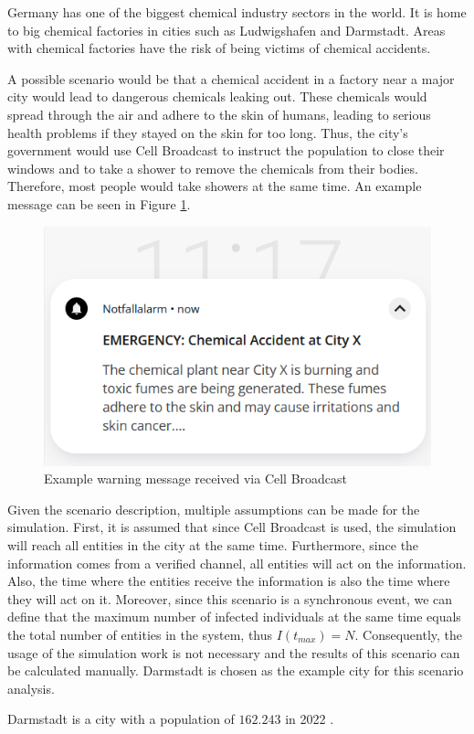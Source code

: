 Germany has one of the biggest chemical industry sectors in the world.
It is home to big chemical factories in cities such as Ludwigshafen and
Darmstadt. Areas with chemical factories have the risk of being
victims of chemical accidents.

A possible scenario would be that a chemical accident in a 
factory near a major city would lead to dangerous chemicals 
leaking out. These chemicals would spread through the air 
and adhere to the skin of humans, leading to serious 
health problems if they stayed on the skin for too long.
Thus, the city's government would use Cell Broadcast to
instruct the population to close their windows and 
to take a shower to remove the chemicals from their bodies.
Therefore, most people would take showers at the same time.
An example message can be seen in Figure \ref{warningmessage}.

\begin{figure}[!ht]
    \center
    \includegraphics[scale=.7]{figs/emergencychemical.png}
    \caption{Example warning message received via Cell Broadcast}
    \label{warningmessage}
\end{figure}

Given the scenario description, multiple assumptions can be
made for the simulation.
First, it is assumed that since Cell Broadcast is used, the simulation
will reach all entities in the city at the same time.
Furthermore, since the information comes from a verified channel,
all entities will act on the information. Also, the time where the
entities receive the information is also the time where they will act
on it.
Moreover, since this scenario is a synchronous event, we can define that the
maximum number of infected individuals at the same time equals
the total number of entities in the system, thus $I(t_{max})=N$.
Consequently, the usage of the simulation work is not necessary
and the results of this scenario can be calculated manually.
Darmstadt is chosen as the example city for this scenario analysis.

Darmstadt is a city with a population of $162.243$ in 2022 
\cite{statistadarmstadt}.  


